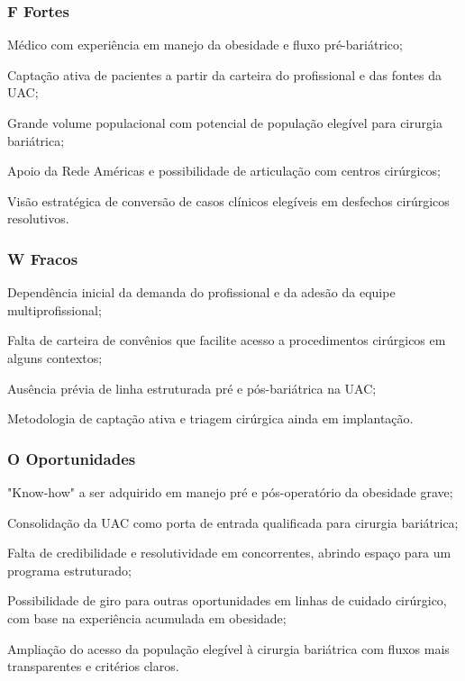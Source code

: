 \documentclass[12pt]{article}
\begin{document}
\subsubsection{F Fortes}
\label{sec:org5e9c1cd}
\begin{hlevelthree}
\item Médico com experiência em manejo da obesidade e fluxo pré-bariátrico;
\item Captação ativa de pacientes a partir da carteira do profissional e das fontes da UAC;
\item Grande volume populacional com potencial de população elegível para cirurgia bariátrica;
\item Apoio da Rede Américas e possibilidade de articulação com centros cirúrgicos;
\item Visão estratégica de conversão de casos clínicos elegíveis em desfechos cirúrgicos resolutivos.
\end{hlevelthree}
\subsubsection{W Fracos}
\label{sec:orgf463165}
\begin{hlevelthree}
\item Dependência inicial da demanda do profissional e da adesão da equipe multiprofissional;
\item Falta de carteira de convênios que facilite acesso a procedimentos cirúrgicos em alguns contextos;
\item Ausência prévia de linha estruturada pré e pós-bariátrica na UAC;
\item Metodologia de captação ativa e triagem cirúrgica ainda em implantação.
\end{hlevelthree}
\subsubsection{O Oportunidades}
\label{sec:orga20178f}
\begin{hlevelthree}
\item "Know-how" a ser adquirido em manejo pré e pós-operatório da obesidade grave;
\item Consolidação da UAC como porta de entrada qualificada para cirurgia bariátrica;
\item Falta de credibilidade e resolutividade em concorrentes, abrindo espaço para um programa estruturado;
\item Possibilidade de giro para outras oportunidades em linhas de cuidado cirúrgico, com base na experiência acumulada em obesidade;
\item Ampliação do acesso da população elegível à cirurgia bariátrica com fluxos mais transparentes e critérios claros.
\end{hlevelthree}
\end{document}
